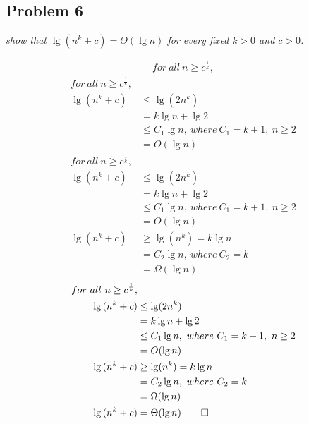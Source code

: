 \documentclass{beamer}
\begin{document}
        
        
    \subsection{Problem 6}
    
        \begin{frame}[c,shrink]{\subsecname}
            \textit{show that $\lg(n^k+c) = \Theta(\lg{n})$ for every fixed $k>0$ and $c>0$.}
            \begin{overprint}
            \begin{align*}
                for\ all\ n \geq c^{\frac{1}{k}},
            \end{align*}
            \begin{align*}
                for\ all\ n \geq c^{\frac{1}{k}},&\\
                \lg{(n^k+c)} &\leq \lg(2n^k)\\
                		  &=    k\lg{n}+\lg{2}\\
                		  &\leq C_1\lg{n},\ where\ C_1= k+1,\ n\geq 2\\
                		  &=    O(\lg{n})
            \end{align*}
            \begin{align*}
                for\ all\ n \geq c^{\frac{1}{k}},&\\
                \lg{(n^k+c)} &\leq \lg(2n^k)\\
                		  &=    k\lg{n}+\lg{2}\\
                		  &\leq C_1\lg{n},\ where\ C_1= k+1,\ n\geq 2\\
                		  &=    O(\lg{n})\\
                \lg{(n^k+c)} &\geq \lg(n^k) = k\lg{n}\\
                		  &= C_2\lg{n},\ where\ C_2= k\\
                		  &= \Omega(\lg{n})
            \end{align*}
            \begin{align*}
                for\ all\ n \geq c^{\frac{1}{k}},&\\
                \lg{(n^k+c)} &\leq \lg(2n^k)\\
                		  &=    k\lg{n}+\lg{2}\\
                		  &\leq C_1\lg{n},\ where\ C_1= k+1,\ n\geq 2\\
                		  &=    O(\lg{n})\\
                \lg{(n^k+c)} &\geq \lg(n^k) = k\lg{n}\\
                		  &= C_2\lg{n},\ where\ C_2= k\\
                		  &= \Omega(\lg{n})\\
                \lg{(n^k+c)} &= \Theta(\lg{n}) \qed
            \end{align*}
            \end{overprint}
        \end{frame}
        
\end{document}
